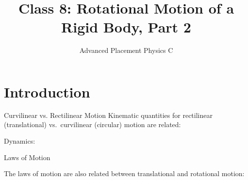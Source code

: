 \documentclass[12pt,compress,aspectratio=169]{beamer}
\title{Class 8: Rotational Motion of a Rigid Body, Part 2}
\subtitle{Advanced Placement Physics C}
\begin{document}
\begin{frame}
  \maketitle
\end{frame}



\section{Introduction}

\begin{frame}{Curvilinear vs. Rectilinear Motion}
  Kinematic quantities for rectilinear (translational) vs.\ curvilinear
  (circular) motion are related:

  \vspace{-.5in}{\Large
    \begin{align*}
      \vec r &\quad\rightarrow\quad \theta \\
      \vec v &\quad\rightarrow\quad \omega \\
      \vec a &\quad\rightarrow\quad \alpha
    \end{align*}
  }

  Dynamics:
  
  \vspace{-.5in}{\Large
    \begin{align*}
      m &\quad\rightarrow\quad I\\
      \vec F &\quad\rightarrow\quad \vec\tau\\
      \vec p=m\vec v &\quad\rightarrow\quad \vec L=I\vec\omega
    \end{align*}
  }
\end{frame}



\begin{frame}{Laws of Motion}

  The laws of motion are also related between translational and rotational
  motion:
  
\end{frame}
\end{document}
